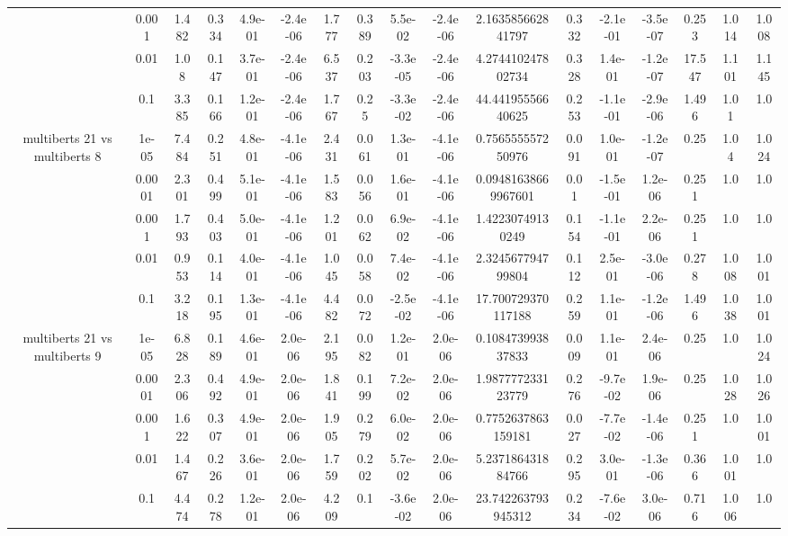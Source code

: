 \begin{tabular}{|c|c|c|c|c|c|c|c|c|c|c|c|c|c|c|c|c|}
 & 0.001 & 1.482 & 0.334 & 4.9e-01 & -2.4e-06 & 1.777 & 0.389 & 5.5e-02 & -2.4e-06 & 2.163585662841797 & 0.332 & -2.1e-01 & -3.5e-07 & 0.253 & 1.014 & 1.008 \\
 & 0.01 & 1.08 & 0.147 & 3.7e-01 & -2.4e-06 & 6.537 & 0.203 & -3.3e-05 & -2.4e-06 & 4.274410247802734 & 0.328 & 1.4e-01 & -1.2e-07 & 17.547 & 1.101 & 1.145 \\
 & 0.1 & 3.385 & 0.166 & 1.2e-01 & -2.4e-06 & 1.767 & 0.25 & -3.3e-02 & -2.4e-06 & 44.44195556640625 & 0.253 & -1.1e-01 & -2.9e-06 & 1.496 & 1.01 & 1.0 \\
\hline
\multirow{5}{*}{multiberts 21 vs multiberts 8} & 1e-05 & 7.484 & 0.251 & 4.8e-01 & -4.1e-06 & 2.431 & 0.061 & 1.3e-01 & -4.1e-06 & 0.756555557250976 & 0.091 & 1.0e-01 & -1.2e-07 & 0.25 & 1.04 & 1.024 \\
 & 0.0001 & 2.301 & 0.499 & 5.1e-01 & -4.1e-06 & 1.583 & 0.056 & 1.6e-01 & -4.1e-06 & 0.09481638669967601 & 0.01 & -1.5e-01 & 1.2e-06 & 0.251 & 1.0 & 1.0 \\
 & 0.001 & 1.793 & 0.403 & 5.0e-01 & -4.1e-06 & 1.201 & 0.062 & 6.9e-02 & -4.1e-06 & 1.42230749130249 & 0.154 & -1.1e-01 & 2.2e-06 & 0.251 & 1.0 & 1.0 \\
 & 0.01 & 0.953 & 0.114 & 4.0e-01 & -4.1e-06 & 1.045 & 0.058 & 7.4e-02 & -4.1e-06 & 2.324567794799804 & 0.112 & 2.5e-01 & -3.0e-06 & 0.278 & 1.008 & 1.001 \\
 & 0.1 & 3.218 & 0.195 & 1.3e-01 & -4.1e-06 & 4.482 & 0.072 & -2.5e-02 & -4.1e-06 & 17.700729370117188 & 0.259 & 1.1e-01 & -1.2e-06 & 1.496 & 1.038 & 1.001 \\
\hline
\multirow{5}{*}{multiberts 21 vs multiberts 9} & 1e-05 & 6.828 & 0.189 & 4.6e-01 & 2.0e-06 & 2.195 & 0.082 & 1.2e-01 & 2.0e-06 & 0.108473993837833 & 0.009 & 1.1e-01 & 2.4e-06 & 0.25 & 1.0 & 1.024 \\
 & 0.0001 & 2.306 & 0.492 & 4.9e-01 & 2.0e-06 & 1.841 & 0.199 & 7.2e-02 & 2.0e-06 & 1.987777233123779 & 0.276 & -9.7e-02 & 1.9e-06 & 0.25 & 1.028 & 1.026 \\
 & 0.001 & 1.622 & 0.307 & 4.9e-01 & 2.0e-06 & 1.905 & 0.279 & 6.0e-02 & 2.0e-06 & 0.7752637863159181 & 0.027 & -7.7e-02 & -1.4e-06 & 0.251 & 1.0 & 1.001 \\
 & 0.01 & 1.467 & 0.226 & 3.6e-01 & 2.0e-06 & 1.759 & 0.202 & 5.7e-02 & 2.0e-06 & 5.237186431884766 & 0.295 & 3.0e-01 & -1.3e-06 & 0.366 & 1.001 & 1.0 \\
 & 0.1 & 4.474 & 0.278 & 1.2e-01 & 2.0e-06 & 4.209 & 0.1 & -3.6e-02 & 2.0e-06 & 23.742263793945312 & 0.234 & -7.6e-02 & 3.0e-06 & 0.716 & 1.006 & 1.0 \\

\end{tabular}
